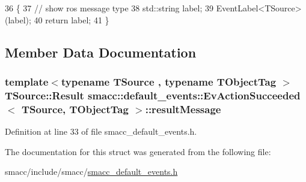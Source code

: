 \begin{DoxyCode}
36   \{
37     \textcolor{comment}{// show ros message type}
38     std::string label;
39     EventLabel<TSource>(label);
40     \textcolor{keywordflow}{return} label;
41   \}
\end{DoxyCode}


\subsection{Member Data Documentation}
\subsubsection[{\texorpdfstring{result\+Message}{resultMessage}}]{\setlength{\rightskip}{0pt plus 5cm}template$<$typename T\+Source , typename T\+Object\+Tag $>$ T\+Source\+::\+Result {\bf smacc\+::default\+\_\+events\+::\+Ev\+Action\+Succeeded}$<$ T\+Source, T\+Object\+Tag $>$\+::result\+Message}\hypertarget{structsmacc_1_1default__events_1_1EvActionSucceeded_a5178997ebcf9a7a738e0bda57bd658d1}{}\label{structsmacc_1_1default__events_1_1EvActionSucceeded_a5178997ebcf9a7a738e0bda57bd658d1}


Definition at line 33 of file smacc\+\_\+default\+\_\+events.\+h.



The documentation for this struct was generated from the following file\+:\begin{DoxyCompactItemize}
\item 
smacc/include/smacc/\hyperlink{smacc__default__events_8h}{smacc\+\_\+default\+\_\+events.\+h}\end{DoxyCompactItemize}
